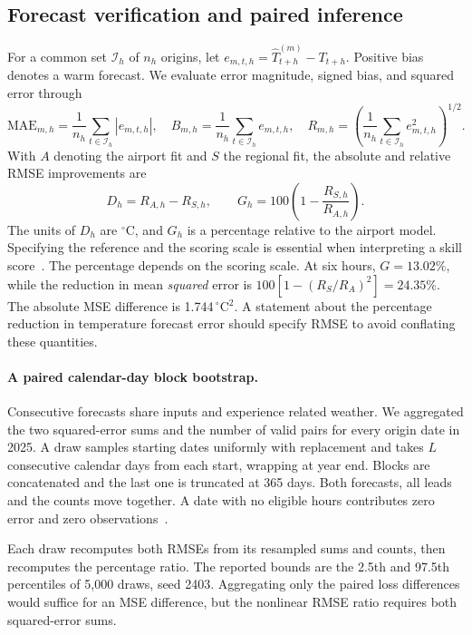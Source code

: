 \documentclass[11pt,letterpaper]{article}
\newcommand{\celsius}{\ensuremath{^{\circ}\mathrm{C}}}\newcommand{\code}[1]{\texttt{\small #1}}
\begin{document}
\subsection{Forecast verification and paired inference}\label{uncertainty}
For a common set $\mathcal I_h$ of $n_h$ origins, let $e_{m,t,h}=\widehat T^{(m)}_{t+h}-T_{t+h}$. Positive bias denotes a warm forecast. We evaluate error magnitude, signed bias, and squared error through
\begin{equation}\label{eq:errors}
 \mathrm{MAE}_{m,h}=\frac1{n_h}\sum_{t\in\mathcal I_h}|e_{m,t,h}|,\quad
 B_{m,h}=\frac1{n_h}\sum_{t\in\mathcal I_h}e_{m,t,h},\quad
 R_{m,h}=\left(\frac1{n_h}\sum_{t\in\mathcal I_h}e_{m,t,h}^2\right)^{1/2}.
\end{equation}
With $A$ denoting the airport fit and $S$ the regional fit, the absolute and relative RMSE improvements are
\begin{equation}\label{eq:gain}
 D_h=R_{A,h}-R_{S,h},\qquad G_h=100\left(1-\frac{R_{S,h}}{R_{A,h}}\right).
\end{equation}
The units of $D_h$ are \celsius{}, and $G_h$ is a percentage relative to the airport model. Specifying the reference and the scoring scale is essential when interpreting a skill score~\cite{murphy}.
The percentage depends on the scoring scale. At six hours, $G=13.02\%$, while the reduction in mean \emph{squared} error is $100[1-(R_S/R_A)^2]=24.35\%$. The absolute MSE difference is 1.744\,\celsius$^2$. A statement about the percentage reduction in temperature forecast error should specify RMSE to avoid conflating these quantities.

\paragraph{A paired calendar-day block bootstrap.}
Consecutive forecasts share inputs and experience related weather. We aggregated the two squared-error sums and the number of valid pairs for every origin date in 2025. A draw samples starting dates uniformly with replacement and takes $L$ consecutive calendar days from each start, wrapping at year end. Blocks are concatenated and the last one is truncated at 365 days. Both forecasts, all leads and the counts move together. A date with no eligible hours contributes zero error and zero observations~\cite{politis}.

Each draw recomputes both RMSEs from its resampled sums and counts, then recomputes the percentage ratio. The reported bounds are the 2.5th and 97.5th percentiles of 5,000 draws, seed 2403. Aggregating only the paired loss differences would suffice for an MSE difference, but the nonlinear RMSE ratio requires both squared-error sums.
\end{document}

